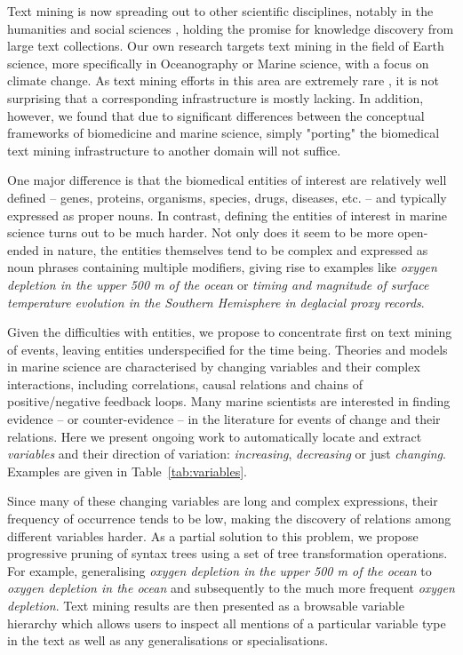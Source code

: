 \documentclass[11pt]{article}
\begin{document}
Text mining is now spreading out to other scientific disciplines, notably in the humanities and social sciences \cite{oconnor2011}, holding the promise for knowledge discovery from large text collections.
Our own research targets text mining in the field of Earth science, more specifically in Oceanography or Marine science, with a focus on climate change.
As text mining efforts in this area are extremely rare \cite{ekstrom2008exploratory,vossen-EtAl:2010:ONTOLEX,Zhang2013GeoDeepDive,marsi2014towards,aamot2014literature}, it is not surprising that a corresponding infrastructure is mostly lacking.
In addition, however, we found that due to significant differences between the conceptual frameworks of biomedicine and marine science, simply "porting" the biomedical text mining infrastructure to another domain will not suffice.

One major difference is that the biomedical entities of interest are relatively well defined -- genes, proteins, organisms, species, drugs, diseases, etc. -- and typically expressed as proper nouns.
In contrast, defining the entities of interest in marine science turns out to be much harder.
Not only does it seem to be more open-ended in nature, the entities themselves tend to be complex and expressed as noun phrases containing multiple modifiers, giving rise to examples like \emph{oxygen depletion in the upper 500 m of the ocean} or \emph{timing and magnitude of surface temperature evolution in the Southern Hemisphere in deglacial proxy records}.

Given the difficulties with entities, 
we propose to concentrate first on text mining of events, leaving entities underspecified for the time being. 
Theories and models in marine science are characterised by changing variables and their complex interactions, including correlations, causal relations and chains of positive/negative feedback loops.
Many marine scientists are interested in finding evidence -- or counter-evidence -- in the literature for events of change and their relations.    
Here we present ongoing work to automatically locate and extract \emph{variables} and their direction of variation: \emph{increasing}, \emph{decreasing} or just \emph{changing}. 
Examples are given in Table~\ref{tab:variables}.

Since many of these changing variables are long and complex expressions, their frequency of occurrence tends to be low, making the discovery of relations among different variables harder.
As a partial solution to this problem, we propose progressive pruning of syntax trees using a set of tree transformation operations.
For example, generalising \emph{oxygen depletion in the upper 500 m of the ocean} to \emph{oxygen depletion in the ocean} and subsequently to the much more frequent \emph{oxygen depletion}.
Text mining results are then presented as a browsable variable hierarchy which allows users to inspect all mentions of a particular variable type in the text as well as any generalisations or specialisations. 
   
\end{document}
